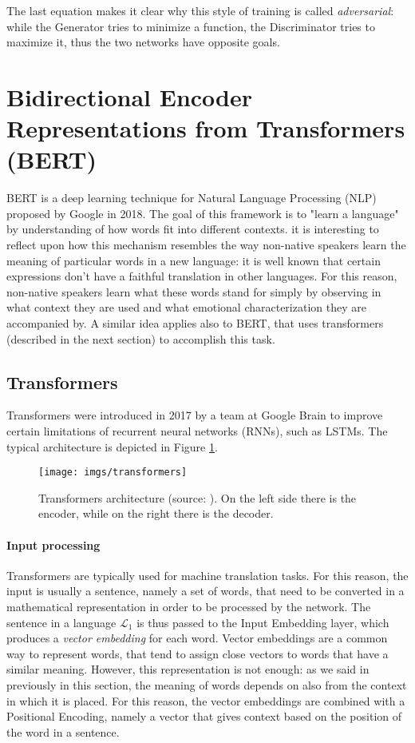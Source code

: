 \documentclass[target=mst,aauheader=aics]{thud}
\theoremstyle{definition}
\begin{document}
The last equation makes it clear why this style of training is called \textit{adversarial}: while the Generator tries to minimize a function, the Discriminator tries to maximize it, thus the two networks have opposite goals.

\section{Bidirectional Encoder Representations from Transformers (BERT)}
BERT \cite{Devlin2018} is a deep learning technique for Natural Language Processing (NLP) proposed by Google in 2018. The goal of this framework is to "learn a language" by understanding of how words fit into different contexts. it is interesting to reflect upon how this mechanism resembles the way non-native speakers learn the meaning of particular words in a new language: it is well known that certain expressions don't have a faithful translation in other languages. For this reason, non-native speakers learn what these words stand for simply by observing in what context they are used and what emotional characterization they are accompanied by. A similar idea applies also to BERT, that uses transformers (described in the next section) to accomplish this task.

\subsection{Transformers}
Transformers \cite{Vaswani2017} were introduced in 2017 by a team at Google Brain to improve certain limitations of recurrent neural networks (RNNs), such as LSTMs. The typical architecture is depicted in Figure \ref{fig:transformer}.
\begin{figure}
	\centering
	\texttt{[image: imgs/transformers]}
	\captionsetup{width=.7\linewidth}
	\caption{Transformers architecture (source: \cite{Vaswani2017}). On the left side there is the encoder, while on the right there is the decoder.}
	\label{fig:transformer}
\end{figure}

\paragraph{Input processing}
Transformers are typically used for machine translation tasks. For this reason, the input is usually a sentence, namely a set of words, that need to be converted in a mathematical representation in order to be processed by the network. The sentence in a language $\mathcal{L}_1$ is thus passed to the Input Embedding layer, which produces a \textit{vector embedding} for each word. Vector embeddings are a common way to represent words, that tend to assign close vectors to words that have a similar meaning. However, this representation is not enough: as we said in previously in this section, the meaning of words depends on also from the context in which it is placed. For this reason, the vector embeddings are combined with a Positional Encoding, namely a vector that gives context based on the position of the word in a sentence. 
\end{document}
